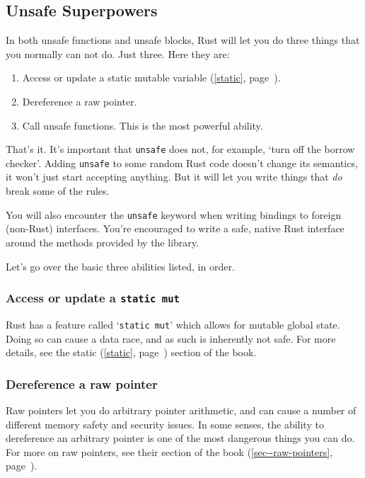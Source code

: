 \documentclass[a4paper,]{book}
\renewcommand*{\hyperref}[2][\ar]{%
  \def\ar{#2}%
  #2 (\autoref{#1}, page~\pageref{#1})}
\providecommand{\tightlist}{%
  \setlength{\itemsep}{0pt}\setlength{\parskip}{0pt}}
\begin{document}
\subsection{Unsafe Superpowers}\label{unsafe-superpowers}

In both unsafe functions and unsafe blocks, Rust will let you do three
things that you normally can not do. Just three. Here they are:

\begin{enumerate}
\def\labelenumi{\arabic{enumi}.}
\tightlist
\item
  Access or update a \hyperref[static]{static mutable variable}.
\item
  Dereference a raw pointer.
\item
  Call unsafe functions. This is the most powerful ability.
\end{enumerate}

That's it. It's important that \texttt{unsafe} does not, for example,
`turn off the borrow checker'. Adding \texttt{unsafe} to some random
Rust code doesn't change its semantics, it won't just start accepting
anything. But it will let you write things that \emph{do} break some of
the rules.

You will also encounter the \texttt{unsafe} keyword when writing
bindings to foreign (non-Rust) interfaces. You're encouraged to write a
safe, native Rust interface around the methods provided by the library.

Let's go over the basic three abilities listed, in order.

\subsubsection{\texorpdfstring{Access or update a
\texttt{static\ mut}}{Access or update a static mut}}\label{access-or-update-a-static-mut}

Rust has a feature called `\texttt{static\ mut}' which allows for
mutable global state. Doing so can cause a data race, and as such is
inherently not safe. For more details, see the \hyperref[static]{static}
section of the book.

\subsubsection{Dereference a raw
pointer}\label{dereference-a-raw-pointer}

Raw pointers let you do arbitrary pointer arithmetic, and can cause a
number of different memory safety and security issues. In some senses,
the ability to dereference an arbitrary pointer is one of the most
dangerous things you can do. For more on raw pointers, see
\hyperref[sec--raw-pointers]{their section of the book}.
\end{document}
